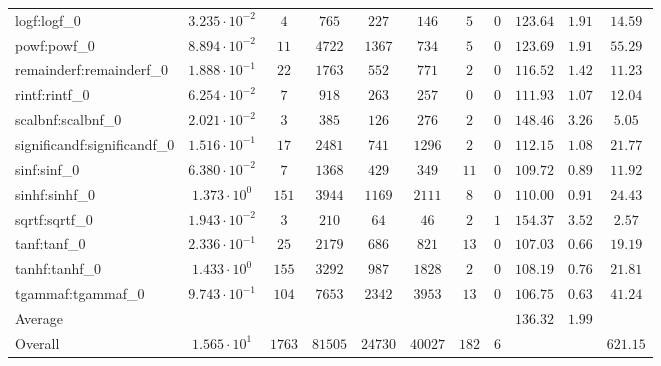 \begin{tabular}{|l|c|c|c|c|c|c|c|c|c|c|}
logf:logf\_0                 & $ 3.235 \cdot 10^{-2} $ & $ 4      $ & $ 765   $ & $ 227   $ & $ 146   $ & $ 5   $ & $ 0 $ & $ 123.64      $ & $ 1.91    $ & $ 14.59   $ \\
powf:powf\_0                 & $ 8.894 \cdot 10^{-2} $ & $ 11     $ & $ 4722  $ & $ 1367  $ & $ 734   $ & $ 5   $ & $ 0 $ & $ 123.69      $ & $ 1.91    $ & $ 55.29   $ \\
remainderf:remainderf\_0     & $ 1.888 \cdot 10^{-1} $ & $ 22     $ & $ 1763  $ & $ 552   $ & $ 771   $ & $ 2   $ & $ 0 $ & $ 116.52      $ & $ 1.42    $ & $ 11.23   $ \\
rintf:rintf\_0               & $ 6.254 \cdot 10^{-2} $ & $ 7      $ & $ 918   $ & $ 263   $ & $ 257   $ & $ 0   $ & $ 0 $ & $ 111.93      $ & $ 1.07    $ & $ 12.04   $ \\
scalbnf:scalbnf\_0           & $ 2.021 \cdot 10^{-2} $ & $ 3      $ & $ 385   $ & $ 126   $ & $ 276   $ & $ 2   $ & $ 0 $ & $ 148.46      $ & $ 3.26    $ & $ 5.05    $ \\
significandf:significandf\_0 & $ 1.516 \cdot 10^{-1} $ & $ 17     $ & $ 2481  $ & $ 741   $ & $ 1296  $ & $ 2   $ & $ 0 $ & $ 112.15      $ & $ 1.08    $ & $ 21.77   $ \\
sinf:sinf\_0                 & $ 6.380 \cdot 10^{-2} $ & $ 7      $ & $ 1368  $ & $ 429   $ & $ 349   $ & $ 11  $ & $ 0 $ & $ 109.72      $ & $ 0.89    $ & $ 11.92   $ \\
sinhf:sinhf\_0               & $ 1.373 \cdot 10^{0}  $ & $ 151    $ & $ 3944  $ & $ 1169  $ & $ 2111  $ & $ 8   $ & $ 0 $ & $ 110.00      $ & $ 0.91    $ & $ 24.43   $ \\
sqrtf:sqrtf\_0               & $ 1.943 \cdot 10^{-2} $ & $ 3      $ & $ 210   $ & $ 64    $ & $ 46    $ & $ 2   $ & $ 1 $ & $ 154.37      $ & $ 3.52    $ & $ 2.57    $ \\
tanf:tanf\_0                 & $ 2.336 \cdot 10^{-1} $ & $ 25     $ & $ 2179  $ & $ 686   $ & $ 821   $ & $ 13  $ & $ 0 $ & $ 107.03      $ & $ 0.66    $ & $ 19.19   $ \\
tanhf:tanhf\_0               & $ 1.433 \cdot 10^{0}  $ & $ 155    $ & $ 3292  $ & $ 987   $ & $ 1828  $ & $ 2   $ & $ 0 $ & $ 108.19      $ & $ 0.76    $ & $ 21.81   $ \\
tgammaf:tgammaf\_0           & $ 9.743 \cdot 10^{-1} $ & $ 104    $ & $ 7653  $ & $ 2342  $ & $ 3953  $ & $ 13  $ & $ 0 $ & $ 106.75      $ & $ 0.63    $ & $ 41.24   $ \\
\hline
Average                      & $                     $ & $        $ & $       $ & $       $ & $       $ & $     $ & $   $ & $ 136.32      $ & $ 1.99    $ & $         $ \\
\hline
Overall                      & $ 1.565 \cdot 10^{1}  $ & $ 1763   $ & $ 81505 $ & $ 24730 $ & $ 40027 $ & $ 182 $ & $ 6 $ & $             $ & $         $ & $ 621.15  $ \\
\hline
\end{tabular}
